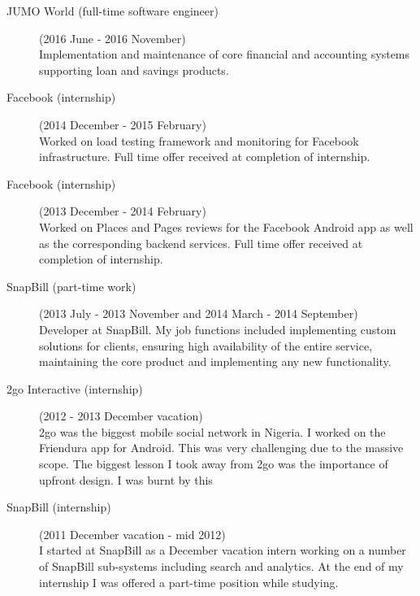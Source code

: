 \documentclass[margin,line,a4paper]{resume}
\begin{document}
\begin{resume}
\begin{description}
              \item[JUMO World (full-time software engineer)] (2016 June - 2016 November) \\
                Implementation and maintenance of core financial and accounting systems supporting loan and savings products.

                \item[Facebook (internship)] (2014 December - 2015 February) \\
                    Worked on load testing framework and monitoring for Facebook infrastructure.
                    Full time offer received at completion of internship.

                \item[Facebook (internship)] (2013 December - 2014 February) \\
                    Worked on Places and Pages reviews for the Facebook Android app as well as the corresponding
                    backend services. Full time offer received at completion of internship.

                \item[SnapBill (part-time work)] (2013 July - 2013 November and 2014 March - 2014 September) \\
                    Developer at SnapBill. My job functions included implementing custom solutions for clients,
                    ensuring high availability of the entire service, maintaining the
                    core product and implementing any new functionality. 
                \item[2go Interactive (internship)] (2012 - 2013 December vacation) \\
                    2go was the biggest mobile social network in Nigeria. I worked on the Friendura app for Android. 
                    This was very challenging due to the massive scope. The biggest lesson I took away from 
                    2go was the importance of upfront design. I was burnt by this 


                \item[SnapBill (internship)] (2011 December vacation - mid 2012) \\
                    I started at SnapBill as a December vacation intern working on a number of SnapBill 
                    sub-systems including search and analytics. At the end of my internship I was offered a part-time position while studying. 
            \end{description}


\end{resume}
\end{document}
